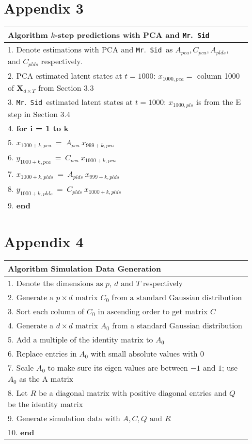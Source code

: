 \documentclass[12pt]{article}
\providecommand{\mb}[1]{\boldsymbol{#1}}
\newcommand{\bX}{\mb{X}}
\newcommand{\mrsid}{{\sc \texttt{Mr}.~\texttt{Sid}}}
\begin{document}
\section*{Appendix 3}
\label{sec:appendix3}
\begin{tabular}{l}
\hline
\textbf{Algorithm } $k$-step predictions with PCA and \mrsid\\
\hline
 1. Denote estimations with PCA and \mrsid~as $A_{pca},C_{pca},A_{plds},$ and $C_{plds}$ respectively.\\
 2. PCA estimated latent states at $t=1000$: $x_{1000,pca} = $ column 1000 of $\bX_{d\times T}$ from Section 3.3 \\
 3. \mrsid~estimated latent states at $t=1000$: $x_{1000,pls}$ is from the E step in Section 3.4\\
 4. \textbf{for i = 1 to k}\\
 5. \hspace{10mm}		$x_{1000+k,pca}\ =\ A_{pca}\ x_{999+k,pca}$\\
 6.	\hspace{10mm}	$y_{1000+k,pca}\ =\ C_{pca}\ x_{1000+k,pca}$\\
 7.	\hspace{10mm}	$x_{1000+k,plds}\ =\ A_{plds}\ x_{999+k,plds}$\\
 8.	\hspace{10mm}	$y_{1000+k,plds}\ =\ C_{plds}\ x_{1000+k,plds}$\\
 9. \textbf{end}\\
\hline
\end{tabular}

\section*{Appendix 4}
\label{sec:appendix4}
\begin{tabular}{l}
\hline
\textbf{Algorithm } Simulation Data Generation\\
\hline
 1. Denote the dimensions as $p$, $d$ and $T$ respectively\\
 2. Generate a $p\times d$ matrix $C_0$ from a standard Gaussian distribution\\
 3. Sort each column of $C_0$ in ascending order to get matrix $C$ \\
 4. Generate a $d\times d$ matrix $A_0$ from a standard Gaussian distribution\\
 5. Add a multiple of the identity matrix to $A_0$\\
 6.	Replace entries in $A_0$ with small absolute values with $0$\\
 7.	Scale $A_0$ to make sure its eigen values are between $-1$ and $1$; use $A_0$ as the A matrix\\
 8.	Let $R$ be a diagonal matrix with positive diagonal entries and $Q$ be the identity matrix \\
 9. Generate simulation data with $A, C, Q$ and $R$ \\
 10. \textbf{end}\\
\hline
\end{tabular}
\end{document}
